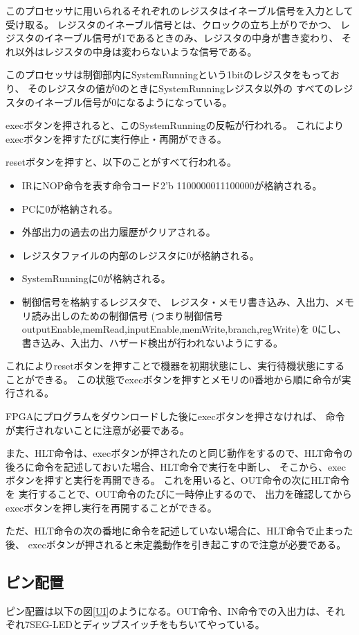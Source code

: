 \documentclass[a4j,titlepage]{jarticle}
\begin{document}
このプロセッサに用いられるそれぞれのレジスタはイネーブル信号を入力として受け取る。
レジスタのイネーブル信号とは、クロックの立ち上がりでかつ、
レジスタのイネーブル信号が1であるときのみ、レジスタの中身が書き変わり、
それ以外はレジスタの中身は変わらないような信号である。

このプロセッサは制御部内にSystemRunningという1bitのレジスタをもっており、
そのレジスタの値が0のときにSystemRunningレジスタ以外の
すべてのレジスタのイネーブル信号が0になるようになっている。

execボタンを押されると、このSystemRunningの反転が行われる。
これによりexecボタンを押すたびに実行停止・再開ができる。

resetボタンを押すと、以下のことがすべて行われる。
\begin{itemize}
\item IRにNOP命令を表す命令コード2'b 1100000011100000が格納される。
\item PCに0が格納される。
\item 外部出力の過去の出力履歴がクリアされる。
\item レジスタファイルの内部のレジスタに0が格納される。
\item SystemRunningに0が格納される。
\item 制御信号を格納するレジスタで、
レジスタ・メモリ書き込み、入出力、メモリ読み出しのための制御信号
(つまり制御信号outputEnable,memRead,inputEnable,memWrite,branch,regWrite)を
0にし、書き込み、入出力、ハザード検出が行われないようにする。
\end{itemize}
これによりresetボタンを押すことで機器を初期状態にし、実行待機状態にすることができる。
この状態でexecボタンを押すとメモリの0番地から順に命令が実行される。

FPGAにプログラムをダウンロードした後にexecボタンを押さなければ、
命令が実行されないことに注意が必要である。

また、HLT命令は、execボタンが押されたのと同じ動作をするので、HLT命令の
後ろに命令を記述しておいた場合、HLT命令で実行を中断し、
そこから、execボタンを押すと実行を再開できる。
これを用いると、OUT命令の次にHLT命令を
実行することで、OUT命令のたびに一時停止するので、
出力を確認してからexecボタンを押し実行を再開することができる。

ただ、HLT命令の次の番地に命令を記述していない場合に、HLT命令で止まった後、
execボタンが押されると未定義動作を引き起こすので注意が必要である。

\subsection{ピン配置}
ピン配置は以下の図\ref{UI}のようになる。OUT命令、IN命令での入出力は、それぞれ7SEG-LEDとディップスイッチをもちいてやっている。
\end{document}

